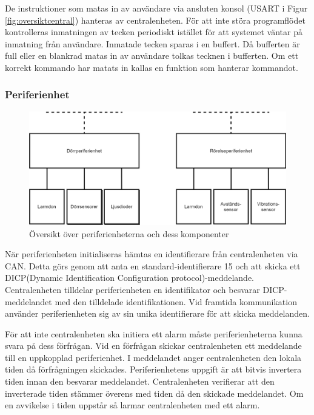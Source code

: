 \documentclass[a4paper]{article}
\begin{document}
De instruktioner som matas in av användare via ansluten konsol (USART i Figur \ref{fig:oversiktcentral}) hanteras av centralenheten.
För att inte störa programflödet kontrolleras inmatningen av tecken periodiskt istället för att systemet väntar på inmatning från användare.
Inmatade tecken sparas i en buffert.
Då bufferten är full eller en blankrad matas in av användare tolkas tecknen i bufferten.
Om ett korrekt kommando har matats in kallas en funktion som hanterar kommandot.


\subsubsection{Periferienhet}
\begin{figure}[H]
    \centering
    \includegraphics[width=\textwidth]{periferi-oversikt-pp.png}
    \caption{Översikt över periferienheterna och dess komponenter}
    \label{fig:oversiktperiferi}
\end{figure}

När periferienheten initialiseras hämtas en identifierare från centralenheten via CAN.
Detta görs genom att anta en standard-identifierare 15 och att skicka ett DICP(Dynamic Identification Configuration protocol)-meddelande.
Centralenheten tilldelar periferienheten en identifikator och besvarar DICP-meddelandet med den tilldelade identifikationen.
Vid framtida kommunikation använder periferienheten sig av sin unika identifierare för att skicka meddelanden.

För att inte centralenheten ska initiera ett alarm måste periferienheterna kunna svara på dess förfrågan.
Vid en förfrågan skickar centralenheten ett meddelande till en uppkopplad periferienhet.
I meddelandet anger centralenheten den lokala tiden då förfrågningen skickades.
Periferienhetens uppgift är att bitvis invertera tiden innan den besvarar meddelandet.
Centralenheten verifierar att den inverterade tiden stämmer överens med tiden då den skickade meddelandet.
Om en avvikelse i tiden uppstår så larmar centralenheten med ett alarm.
\end{document}
